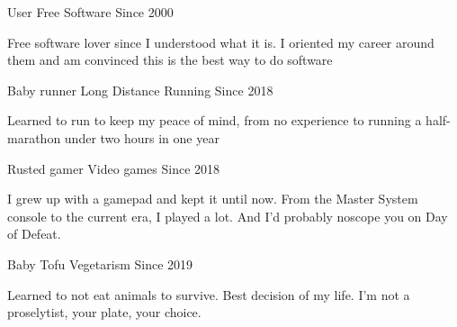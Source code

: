 


\begin{cventries}


\cventry
{User} %
{Free Software} %
{} %
{Since 2000} %
{ %
\begin{cvitems}
\item {Free software lover since I understood what it is. I oriented my career around them and am convinced this is the best way to do software}
\end{cvitems}
}


\cventry
{Baby runner} %
{Long Distance Running} %
{} %
{Since 2018} %
{ %
\begin{cvitems}
\item {Learned to run to keep my peace of mind, from no experience to running a half-marathon under two hours in one year}
\end{cvitems}
}


\cventry
{Rusted gamer} %
{Video games} %
{} %
{Since 2018} %
{ %
\begin{cvitems}
\item {I grew up with a gamepad and kept it until now. From the Master System console to the current era, I played a lot. And I'd probably noscope you on Day of Defeat.}
\end{cvitems}
}


\cventry
{Baby Tofu} %
{Vegetarism} %
{} %
{Since 2019} %
{ %
\begin{cvitems}
\item {Learned to not eat animals to survive. Best decision of my life. I'm not a proselytist, your plate, your choice.}
\end{cvitems}
}



\end{cventries}